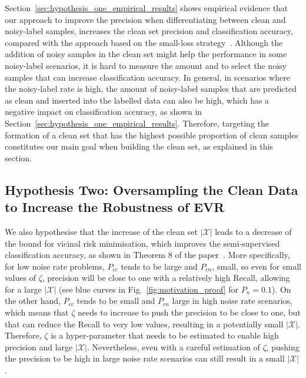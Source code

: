 \documentclass[review]{elsarticle}
\begin{document}
 Section~\ref{sec:hypothesis_one_empirical_results} shows empirical evidence that our approach to improve the precision when differentiating between clean and noisy-label samples, increases the clean set precision and classification accuracy, compared with the approach based on the small-loss strategy~\cite{li2020dividemix}. Although the addition of noisy samples in the clean set might help the performance in some noisy-label scenarios, it is hard to measure the amount and to select the noisy samples that can increase classification accuracy. In general, in scenarios where the noisy-label rate is high, the amount of noisy-label samples that are predicted as clean and inserted into the labelled data can also be high, which has a negative impact on classification accuracy, as shown in Section~\ref{sec:hypothesis_one_empirical_results}. 
 Therefore, targeting the formation of a clean set that has the highest possible proportion of clean samples constitutes our main goal when building the clean set, as explained in this section.






\subsection{Hypothesis Two: Oversampling the Clean Data to Increase the Robustness of EVR}
\label{sec:hypothesis_two}

We also hypothesise that the increase of the clean set $|\mathcal{X}|$ leads to a decrease of the bound for vicinal risk minimisation, which improves the semi-supervised classification accuracy, as shown in Theorem 8 of the paper~\cite{zhang2018generalization}.
More specifically, for low noise rate problems, $P_{cc}$ tends to be large and $P_{cn}$, small, so even for small values of $\zeta$, precision will be close to one with a relatively high Recall, allowing for a large $|\mathcal{X}|$ (see blue curves in Fig.~\ref{fig:motivation_proof} for $P_n=0.1$).
On the other hand, $P_{cc}$ tends to be small and $P_{cn}$ large in high noise rate scenarios, which means that $\zeta$ needs to increase to push the precision to be close to one, but that can reduce the Recall to very low values, resulting in a potentially small $|\mathcal{X}|$.  
Therefore, $\zeta$ is a hyper-parameter that needs to be estimated to enable high precision and large $|\mathcal{X}|$.
Nevertheless, even with a careful estimation of $\zeta$, pushing the precision to be high in large noise rate scenarios can still result in a small $|\mathcal{X}|$.
\end{document}
